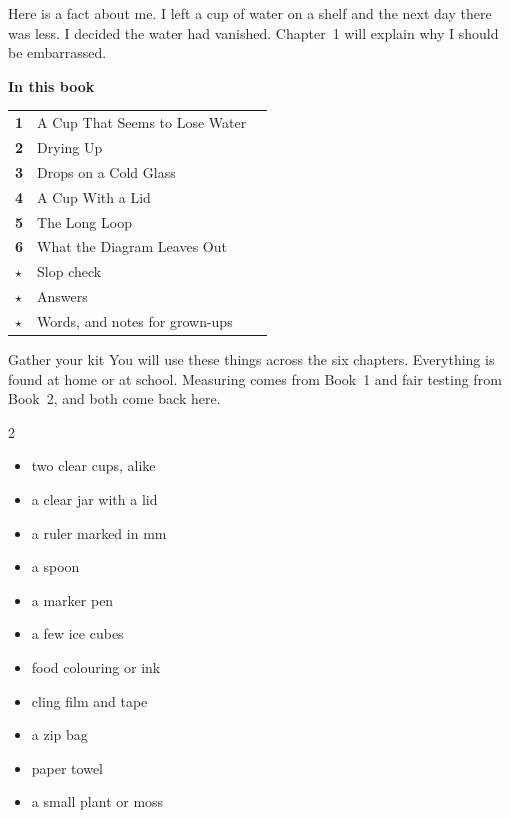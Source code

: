 \begin{multix}[hmm]\multixbot[hmm]\tcblower
Here is a fact about me. I left a cup of water on a shelf and the next day there was less. I decided the water had vanished. Chapter~1 will explain why I should be embarrassed.
\end{multix}
\clearpage

\thispagestyle{plain}
{\sans\bfseries\LARGE\color{ink} In this book}\par\vspace{0.2cm}
{\sans\large
\begin{tabular}{@{}p{0.9cm}p{7.6cm}r@{}}
\textcolor{tangerine}{\bfseries 1} & A Cup That Seems to Lose Water & \pageref{ch1}\\[3pt]
\textcolor{tangerine}{\bfseries 2} & Drying Up & \pageref{ch2}\\[3pt]
\textcolor{tangerine}{\bfseries 3} & Drops on a Cold Glass & \pageref{ch3}\\[3pt]
\textcolor{tangerine}{\bfseries 4} & A Cup With a Lid & \pageref{ch4}\\[3pt]
\textcolor{tangerine}{\bfseries 5} & The Long Loop & \pageref{ch5}\\[3pt]
\textcolor{tangerine}{\bfseries 6} & What the Diagram Leaves Out & \pageref{ch6}\\[3pt]
\textcolor{sky}{\bfseries $\star$} & Slop check & \pageref{slop}\\[3pt]
\textcolor{sky}{\bfseries $\star$} & Answers & \pageref{answers}\\[3pt]
\textcolor{sky}{\bfseries $\star$} & Words, and notes for grown-ups & \pageref{notes}\\
\end{tabular}}

\begin{tryit}{Gather your kit}
You will use these things across the six chapters. Everything is found at home or at school. Measuring comes from Book~1 and fair testing from Book~2, and both come back here.
\begin{multicols}{2}
\begin{itemize}[leftmargin=1.2em]
\item two clear cups, alike
\item a clear jar with a lid
\item a ruler marked in mm
\item a spoon
\item a marker pen
\item a few ice cubes
\item food colouring or ink
\item cling film and tape
\item a zip bag
\item paper towel
\item a small plant or moss
\end{itemize}
\end{multicols}
\end{tryit}

